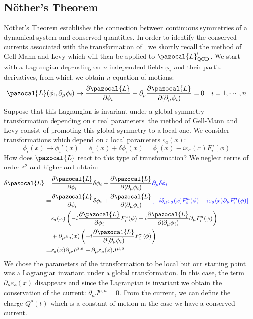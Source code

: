 \documentclass[../main.tex]{subfiles}
\begin{document}
\subsection{N\"other's Theorem}
N\"other's Theorem establishes the connection between continuous symmetries of a dynamical system and conserved quantities. In order to identify the conserved currents associated with the transformation of , we shortly recall the method of Gell-Mann and Levy which will then be applied to $\pazocal{L}_{\text{QCD}}^0$. We start with a Lagrangian depending on $n$ independent fields $\phi_i$ and their partial derivatives, from which we obtain $n$ equation of motions:
\[
\pazocal{L}(\phi_i,\partial_\mu\phi_i)\to\frac{\partial\pazocal{L}}{\partial\phi_i}-\partial_\mu\frac{\partial\pazocal{L}}{\partial(\partial_\mu\phi_i)}=0 \quad i=1,\cdots,n
\]
Suppose that this Lagrangian is invariant under a global symmetry transformation depending on $r$ real parameters: the method of Gell-Mann and Levy consist of promoting this global symmetry to a local one. We consider transformations which depend on $r$ local parameters $\varepsilon_a(x)$:
\[
\phi_i(x)\to\phi_i'(x)=\phi_i(x)+\delta\phi_i(x)=\phi_i(x)-i\varepsilon_a(x)F_i^a(\phi)
\]
How does $\pazocal{L}$ react to this type of transformation? We neglect terms of order $\varepsilon^2$ and higher and obtain:
\begin{align*}
\delta\pazocal{L}=&\frac{\partial\pazocal{L}}{\partial\phi_i}\delta\phi_i+\frac{\partial\pazocal{L}}{\partial(\partial_\mu\phi_i)}{\color{blue}\partial_\mu\delta\phi_i}\\
=&\frac{\partial\pazocal{L}}{\partial\phi_i}\delta\phi_i+\frac{\partial\pazocal{L}}{\partial(\partial_\mu\phi_i)}{\color{blue}[-i\partial_\mu\varepsilon_a(x)F_i^a(\phi)-i\varepsilon_a(x)\partial_\mu F_i^a(\phi)]}\\
=&\varepsilon_a(x)\left(-i\frac{\partial\pazocal{L}}{\partial\phi_i}F_i^a(\phi)-i\frac{\partial\pazocal{L}}{\partial(\partial_\mu\phi_i)}\partial_\mu F_i^a(\phi)\right)\\
&+\partial_\mu\varepsilon_a(x)\left(-i\frac{\partial\pazocal{L}}{\partial(\partial_\mu\phi_i)}F_i^a(\phi)\right)\\
=&\varepsilon_a(x)\partial_\mu J^{\mu,a}+\partial_\mu\varepsilon_a(x)J^{\mu,a}
\end{align*}
We chose the parameters of the transformation to be local but our starting point was a Lagrangian invariant under a global transformation. In this case, the term $\partial_\mu\varepsilon_a(x)$ disappears and since the Lagrangian is invariant we obtain the conservation of the current: $\partial_\mu J^{\mu,a}=0$. From the current, we can define the charge $Q^a(t)$ which is a constant of motion in the case we have a conserved current.
\end{document}
